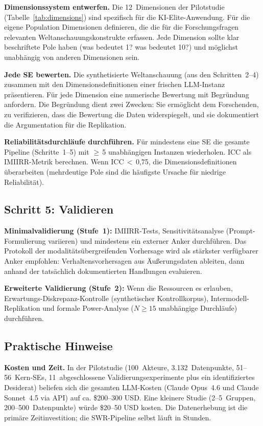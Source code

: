 \documentclass[11pt,a4paper]{article}
\begin{document}
\textbf{Dimensionssystem entwerfen.} Die 12~Dimensionen der Pilotstudie (Tabelle~\ref{tab:dimensions}) sind spezifisch f\"ur die KI-Elite-Anwendung. F\"ur die eigene Population Dimensionen definieren, die die f\"ur die Forschungsfragen relevanten Weltanschauungskonstrukte erfassen. Jede Dimension sollte klar beschriftete Pole haben (was bedeutet 1? was bedeutet 10?) und m\"oglichst unabh\"angig von anderen Dimensionen sein.

\textbf{Jede SE bewerten.} Die synthetisierte Weltanschauung (aus den Schritten~2--4) zusammen mit den Dimensionsdefinitionen einer frischen LLM-Instanz pr\"asentieren. F\"ur jede Dimension eine numerische Bewertung mit Begr\"undung anfordern. Die Begr\"undung dient zwei Zwecken: Sie erm\"oglicht dem Forschenden, zu verifizieren, dass die Bewertung die Daten widerspiegelt, und sie dokumentiert die Argumentation f\"ur die Replikation.

\textbf{Reliabilit\"atsdurchl\"aufe durchf\"uhren.} F\"ur mindestens eine SE die gesamte Pipeline (Schritte~1--5) mit $\geq$\,5 unabh\"angigen Instanzen wiederholen. ICC als IMIIRR-Metrik berechnen. Wenn ICC\,$<$\,0,75, die Dimensionsdefinitionen \"uberarbeiten (mehrdeutige Pole sind die h\"aufigste Ursache f\"ur niedrige Reliabilit\"at).

\subsection{Schritt 5: Validieren}
\label{sec:app:step5}

\textbf{Minimalvalidierung (Stufe~1):} IMIIRR-Tests, Sensitivit\"atsanalyse (Prompt-Formulierung variieren) und mindestens ein externer Anker durchf\"uhren. Das Protokoll der modalit\"ats\"ubergreifenden Vorhersage wird als st\"arkster verf\"ugbarer Anker empfohlen: Verhaltensvorhersagen aus \"Au\ss{}erungsdaten ableiten, dann anhand der tats\"achlich dokumentierten Handlungen evaluieren.

\textbf{Erweiterte Validierung (Stufe~2):} Wenn die Ressourcen es erlauben, Erwartungs-Diskrepanz-Kontrolle (synthetischer Kontrollkorpus), Intermodell-Replikation und formale Power-Analyse ($N \geq 15$ unabh\"angige Durchl\"aufe) durchf\"uhren.


\subsection{Praktische Hinweise}
\label{sec:app:practical}

\textbf{Kosten und Zeit.} In der Pilotstudie (100~Akteure, 3.132~Datenpunkte, 51--56~Kern-SEs, 11~abgeschlossene Validierungsexperimente plus ein identifiziertes Desiderat) beliefen sich die gesamten LLM-Kosten (Claude Opus~4.6 und Claude Sonnet~4.5 via API) auf ca. \$200--300 USD. Eine kleinere Studie (2--5~Gruppen, 200--500~Datenpunkte) w\"urde \$20--50 USD kosten. Die Datenerhebung ist die prim\"are Zeitinvestition; die SWR-Pipeline selbst l\"auft in Stunden.
\end{document}
